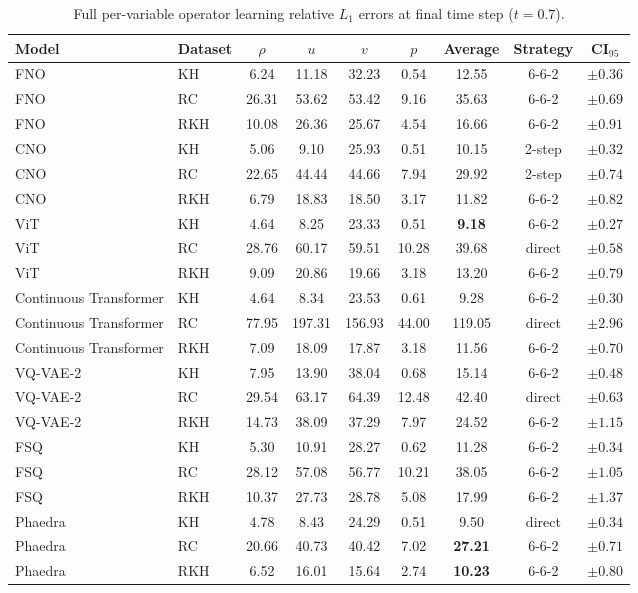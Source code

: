 \begin{table}[h]
    \centering
    \caption{Full per-variable operator learning relative $L_1$ errors at final time step ($t=0.7$).}
    \begin{tabular}{llccccccc}
        \toprule
        Model & Dataset  & $\rho$ & $u$ & $v$ & $p$ & Average & Strategy & CI$_{95}$ \\
        \midrule
        FNO & KH & 6.24 & 11.18 & 32.23 & 0.54 & 12.55 & 6-6-2 & $\pm0.36$ \\
        FNO & RC & 26.31 & 53.62 & 53.42 & 9.16 & 35.63 & 6-6-2 & $\pm0.69$ \\
        FNO & RKH & 10.08 & 26.36 & 25.67 & 4.54 & 16.66 & 6-6-2 & $\pm0.91$ \\
        \midrule
        CNO & KH & 5.06 & 9.10 & 25.93 & 0.51 & 10.15 & 2-step & $\pm0.32$ \\
        CNO & RC & 22.65 & 44.44 & 44.66 & 7.94 & 29.92 & 2-step & $\pm0.74$ \\
        CNO & RKH & 6.79 & 18.83 & 18.50 & 3.17 & 11.82 & 6-6-2 & $\pm0.82$ \\
        \midrule
        ViT & KH & 4.64 & 8.25 & 23.33 & 0.51 & \textbf{9.18} & 6-6-2 & $\pm0.27$ \\
        ViT & RC & 28.76 & 60.17 & 59.51 & 10.28 & 39.68 & direct & $\pm0.58$ \\
        ViT & RKH & 9.09 & 20.86 & 19.66 & 3.18 & 13.20 & 6-6-2 & $\pm0.79$ \\
        \midrule
        Continuous Transformer & KH & 4.64 & 8.34 & 23.53 & 0.61 & 9.28 & 6-6-2 & $\pm0.30$ \\
        Continuous Transformer & RC & 77.95 & 197.31 & 156.93 & 44.00 & 119.05 & direct & $\pm2.96$ \\
        Continuous Transformer & RKH & 7.09 & 18.09 & 17.87 & 3.18 & 11.56 & 6-6-2 & $\pm0.70$ \\
        \midrule
        VQ-VAE-2 & KH & 7.95 & 13.90 & 38.04 & 0.68 & 15.14 & 6-6-2 & $\pm0.48$ \\
        VQ-VAE-2 & RC & 29.54 & 63.17 & 64.39 & 12.48 & 42.40 & direct & $\pm0.63$ \\
        VQ-VAE-2 & RKH & 14.73 & 38.09 & 37.29 & 7.97 & 24.52 & 6-6-2 & $\pm1.15$ \\
        \midrule
        FSQ & KH & 5.30 & 10.91 & 28.27 & 0.62 & 11.28 & 6-6-2 & $\pm0.34$ \\
        FSQ & RC & 28.12 & 57.08 & 56.77 & 10.21 & 38.05 & 6-6-2 & $\pm1.05$ \\
        FSQ & RKH & 10.37 & 27.73 & 28.78 & 5.08 & 17.99 & 6-6-2 & $\pm1.37$ \\
        \midrule
        Phaedra & KH & 4.78 & 8.43 & 24.29 & 0.51 & 9.50 & direct & $\pm0.34$ \\
        Phaedra & RC & 20.66 & 40.73 & 40.42 & 7.02 & \textbf{27.21} & 6-6-2 & $\pm0.71$ \\
        Phaedra & RKH & 6.52 & 16.01 & 15.64 & 2.74 & \textbf{10.23} & 6-6-2 & $\pm0.80$ \\
        \bottomrule
    \end{tabular}
\end{table}
